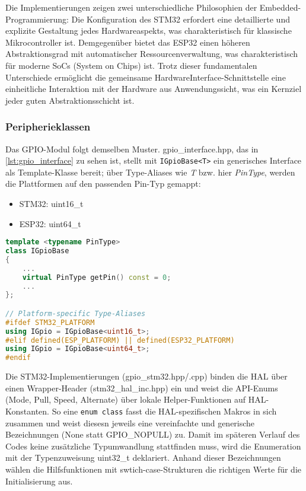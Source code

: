 Die Implementierungen zeigen zwei unterschiedliche Philosophien der Embedded-Programmierung: 
Die Konfiguration des STM32 erfordert eine detaillierte und explizite Gestaltung jedes Hardwareaspekts, was charakteristisch für klassische Mikrocontroller ist.
Demgegenüber bietet das ESP32 einen höheren Abstraktionsgrad mit automatischer Ressourcenverwaltung, was charakteristisch für moderne SoCs (System on Chips) ist.
Trotz dieser fundamentalen Unterschiede ermöglicht die gemeinsame HardwareInterface-Schnittstelle eine einheitliche Interaktion mit der Hardware aus Anwendungssicht, was ein Kernziel jeder guten Abstraktionsschicht ist.

\subsubsection{Peripherieklassen}
Das GPIO-Modul folgt demselben Muster.
gpio\_interface.hpp, das in \cref{lst:gpio_interface} zu sehen ist, stellt mit \texttt{IGpioBase<T>} ein generisches Interface als Template-Klasse bereit; über Type-Aliases wie \textit{T} bzw. hier \textit{PinType}, werden die Plattformen auf den passenden Pin-Typ gemappt:
\begin{itemize}
	\item STM32: uint16\_t
	\item ESP32: uint64\_t
\end{itemize}

\begin{lstlisting}[language=C++, caption={Ausschnitt aus der Interfaceklasse IGpioBase.}, label={lst:gpio_interface}]
template <typename PinType>
class IGpioBase
{
	...
    virtual PinType getPin() const = 0;
	...	
};

// Platform-specific Type-Aliases
#ifdef STM32_PLATFORM
using IGpio = IGpioBase<uint16_t>;
#elif defined(ESP_PLATFORM) || defined(ESP32_PLATFORM)
using IGpio = IGpioBase<uint64_t>;
#endif
\end{lstlisting}

Die STM32-Implementierungen (gpio\_stm32.hpp/.cpp) binden die HAL über einen Wrapper-Header (stm32\_hal\_inc.hpp) ein und weist die API-Enums (Mode, Pull, Speed, Alternate) über lokale Helper-Funktionen auf HAL-Konstanten.
So eine \texttt{enum class} fasst die HAL-spezifischen Makros in sich zusammen und weist diesesn jeweils eine vereinfachte und generische Bezeichnungen (None statt GPIO\_NOPULL) zu.
Damit im späteren Verlauf des Codes keine zusätzliche Typumwandlung stattfinden muss, wird die Enumeration mit der Typenzuweisung uint32\_t deklariert.
Anhand dieser Bezeichnungen wählen die Hilfsfunktionen mit swtich-case-Strukturen die richtigen Werte für die Initialisierung aus.

